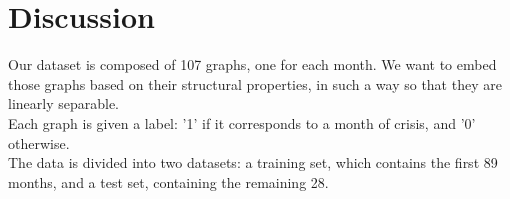 \section{Discussion}

Our dataset is composed of 107 graphs, one for each month. We want to embed those graphs based on their structural properties, in such a way so that they are linearly separable.\\
Each graph is given a label: '1' if it corresponds to a month of crisis, and '0' otherwise.\\

The data is divided into two datasets: a training set, which contains the first 89 months, and a test set, containing the remaining 28.\\